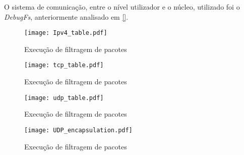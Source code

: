 O sistema de comunicação, entre o nível utilizador e o núcleo, utilizado foi o \textit{DebugFs}, anteriormente analisado em \ref{}.

\begin{figure}[ht]
\centering
\texttt{[image: Ipv4\_table.pdf]}
\caption{Execução de filtragem de pacotes}
\label{fig:run_filter}
\end{figure}


\begin{figure}[ht]
\centering
\texttt{[image: tcp\_table.pdf]}
\caption{Execução de filtragem de pacotes}
\label{fig:run_filter}
\end{figure}

\begin{figure}[ht]
\centering
\texttt{[image: udp\_table.pdf]}
\caption{Execução de filtragem de pacotes}
\label{fig:run_filter}
\end{figure}


\begin{figure}[ht]
\centering
\texttt{[image: UDP\_encapsulation.pdf]}
\caption{Execução de filtragem de pacotes}
\label{fig:run_filter}
\end{figure}







